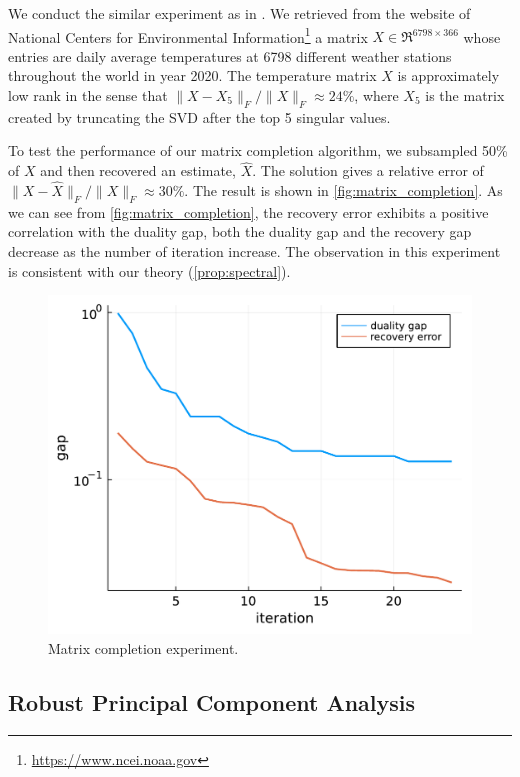 We conduct the similar experiment as in \cite{candes2010matrix}. We retrieved from the website of National Centers for Environmental Information\footnote{\url{https://www.ncei.noaa.gov}} a matrix $X \in \Re^{6798 \times 366}$ whose entries are daily average temperatures at 6798 different weather stations throughout the world in year 2020. The temperature matrix $X$ is approximately low rank in the sense that $\|X - X_5\|_F / \|X\|_F \approx 24\%$, where $X_5$ is the matrix created by truncating the SVD after the top 5 singular values. 

To test the performance of our matrix completion algorithm, we subsampled 50\% of $X$ and then recovered an estimate, $\hat X$.  The solution gives a relative error of $\|X - \hat X\|_F / \|X\|_F \approx 30\%$. The result is shown in \autoref{fig:matrix_completion}.  As we can see from \autoref{fig:matrix_completion}, the recovery error exhibits a positive correlation with the duality gap, both the duality gap and the recovery gap decrease as the number of iteration increase. The observation in this experiment is consistent with our theory (\autoref{prop:spectral}).

\begin{figure}
    \centering
    \includegraphics[width=.5\textwidth]{./figures/matrix_completion.pdf}
    \captionsetup{justification=centering}
    \caption{Matrix completion experiment.}
    \label{fig:matrix_completion}
\end{figure}

\subsection{Robust Principal Component Analysis} \label{sec:rpca}

